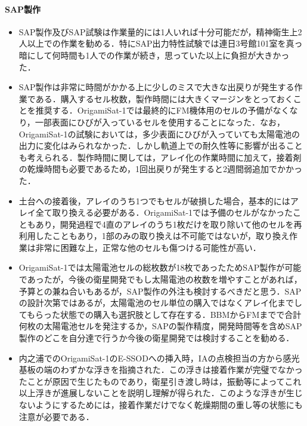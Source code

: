 \paragraph{SAP製作}
\begin{itemize}
	\item SAP製作及びSAP試験は作業量的には1人いれば十分可能だが，精神衛生上2人以上での作業を勧める．特にSAP出力特性試験では連日3号館101室を真っ暗にして何時間も1人での作業が続き，思っていた以上に負担が大きかった．
	\item SAP製作は非常に時間がかかる上に少しのミスで大きな出戻りが発生する作業である．購入するセル枚数，製作時間には大きくマージンをとっておくことを推奨する．OrigamiSat-1では最終的にFM機体用のセルの予備がなくなり，一部表面にひびが入っているセルを使用することになった．なお，OrigamiSat-1の試験においては，多少表面にひびが入っていても太陽電池の出力に変化はみられなかった．しかし軌道上での耐久性等に影響が出ることも考えられる．製作時間に関しては，アレイ化の作業時間に加えて，接着剤の乾燥時間も必要であるため，1回出戻りが発生すると2週間弱追加でかかった．
	\item 土台への接着後，アレイのうち1つでもセルが破損した場合，基本的にはアレイ全て取り換える必要がある．OrigamiSat-1では予備のセルがなかったこともあり，開発過程で4直のアレイのうち1枚だけを取り除いて他のセルを再利用したこともあり，1部のみの取り換えは不可能ではないが，取り換え作業は非常に困難な上，正常な他のセルも傷つける可能性が高い．
	\item OrigamiSat-1では太陽電池セルの総枚数が18枚であったためSAP製作が可能であったが，今後の衛星開発でもし太陽電池の枚数を増やすことがあれば，予算との兼ね合いもあるが，SAP製作の外注も検討するべきだと思う．SAPの設計次第ではあるが，太陽電池のセル単位の購入ではなくアレイ化までしてもらった状態での購入も選択肢として存在する．BBMからFMまでで合計何枚の太陽電池セルを発注するか，SAPの製作精度，開発時間等を含めSAP製作のどこを自分達で行うか今後の衛星開発では検討することを勧める．
	\item 内之浦でのOrigamiSat-1のE-SSODへの挿入時，IAの点検担当の方から感光基板の端のわずかな浮きを指摘された．この浮きは接着作業が完璧でなかったことが原因で生じたものであり，衛星引き渡し時は，振動等によってこれ以上浮きが進展しないことを説明し理解が得られた．このような浮きが生じないようにするためには，接着作業だけでなく乾燥期間の重し等の状態にも注意が必要である．
\end{itemize}
